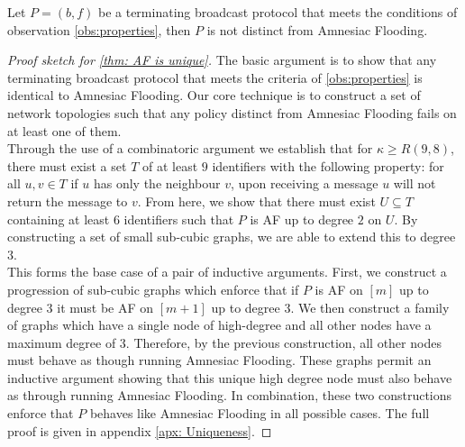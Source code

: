 \begin{theorem}
\label{thm: AF is unique}
    Let $P=(b,f)$ be a terminating broadcast protocol that meets the conditions of observation \ref{obs:properties}, then $P$ is not distinct from Amnesiac Flooding.
\end{theorem}
\begin{proof}[Proof sketch for \cref{thm: AF is unique}]
The basic argument is to show that any terminating broadcast protocol that meets the criteria of \cref{obs:properties} is identical to Amnesiac Flooding.
Our core technique is to construct a set of network topologies such that any policy distinct from Amnesiac Flooding fails on at least one of them.\\
Through the use of a combinatoric argument we establish that for $\kappa\geq R(9,8)$, there must exist a set $T$ of at least $9$ identifiers with the following property: for all $u,v \in T$ if $u$ has only the neighbour $v$, upon receiving a message $u$ will not return the message to $v$.
From here, we show that there must exist $U\subseteq T$ containing at least $6$ identifiers such that $P$ is AF up to degree $2$ on $U$.
By constructing a set of small sub-cubic graphs, we are able to extend this to degree $3$.\\
This forms the base case of a pair of inductive arguments. First, we construct a progression of sub-cubic graphs which enforce that if $P$ is AF on $[m]$ up to degree $3$ it must be AF on $[m+1]$ up to degree $3$.
We then construct a family of graphs which have a single node of high-degree and all other nodes have a maximum degree of $3$. Therefore, by the previous construction, all other nodes must behave as though running Amnesiac Flooding.
These graphs permit an inductive argument showing that this unique high degree node must also behave as through running Amnesiac Flooding.
In combination, these two constructions enforce that $P$ behaves like Amnesiac Flooding in all possible cases.
The full proof is given in appendix \ref{apx: Uniqueness}.
\end{proof}

